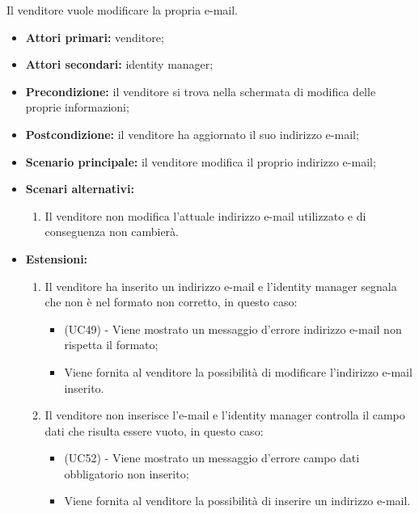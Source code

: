 Il venditore vuole modificare la propria e-mail.
\begin{itemize}
    \item \textbf{Attori primari:} venditore;
    \item \textbf{Attori secondari:} identity manager;
    \item \textbf{Precondizione:} il venditore si trova nella schermata di modifica delle proprie informazioni;
    \item \textbf{Postcondizione:} il venditore ha aggiornato il suo indirizzo e-mail;
    \item \textbf{Scenario principale:} il venditore modifica il proprio indirizzo e-mail;
    \item \textbf{Scenari alternativi:}
    \begin{enumerate}[label=\lett]
    	\item Il venditore non modifica l'attuale indirizzo e-mail utilizzato e di conseguenza non cambierà.
    \end{enumerate}
    \item \textbf{Estensioni:}
    \begin{enumerate}[label=\lett]
    	\item Il venditore ha inserito un indirizzo e-mail e l'identity manager segnala che non è nel formato non corretto, in questo caso:
    	\begin{itemize}
    		\item (UC49) - Viene mostrato un messaggio d'errore indirizzo e-mail non rispetta il formato;
    		\item Viene fornita al venditore la possibilità di modificare l'indirizzo e-mail inserito.
    	\end{itemize}
	    \item Il venditore non inserisce l'e-mail e l'identity manager controlla il campo dati che risulta essere vuoto, in questo caso:
	    \begin{itemize}
	    	\item (UC52) - Viene mostrato un messaggio d'errore campo dati obbligatorio non inserito;
	    	\item Viene fornita al venditore la possibilità di inserire un indirizzo e-mail.
	    \end{itemize}
    \end{enumerate} 
\end{itemize}


